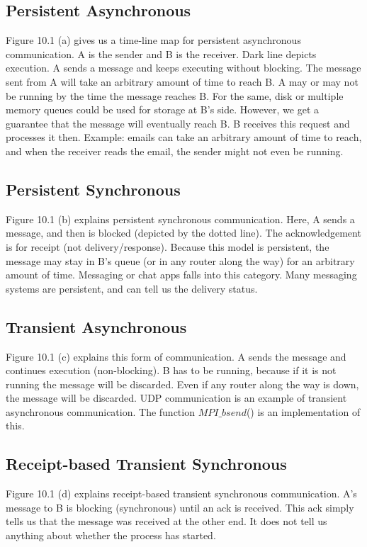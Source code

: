 \documentclass[twoside]{article}
\begin{document}
\subsection{Persistent Asynchronous}
Figure 10.1 (a) gives us a time-line map for persistent asynchronous communication. A is the sender and B is the receiver. Dark line depicts execution. A sends a message and keeps executing without blocking. The message sent from A will take an arbitrary amount of time to reach B. A may or may not be running by the time the message reaches B. For the same, disk or multiple memory queues could be used for storage at B's side. However, we get a guarantee that the message will eventually reach B. B receives this request and processes it then. Example: emails can take an arbitrary amount of time to reach, and when the receiver reads the email, the sender might not even be running. 

\subsection{Persistent Synchronous}
Figure 10.1 (b) explains persistent synchronous communication. Here, A sends a message, and then is blocked (depicted by the dotted line). The acknowledgement is for receipt (not delivery/response). Because this model is persistent, the message may stay in B's queue (or in any router along the way) for an arbitrary amount of time. Messaging or chat apps falls into this category. Many messaging systems are persistent, and can tell us the delivery status.

\subsection{Transient Asynchronous}
Figure 10.1 (c) explains this form of communication. A sends the message and continues execution (non-blocking). B has to be running, because if it is not running the message will be discarded. Even if any router along the way is down, the message will be discarded. UDP communication is an example of transient asynchronous communication. The function $MPI\_bsend$() is an implementation of this.


\subsection{Receipt-based Transient Synchronous}
Figure 10.1 (d) explains receipt-based transient synchronous communication. A's message to B is blocking (synchronous) until an ack is received. This ack simply tells us that the message was received at the other end. It does not tell us anything about whether the process has started.
\end{document}
